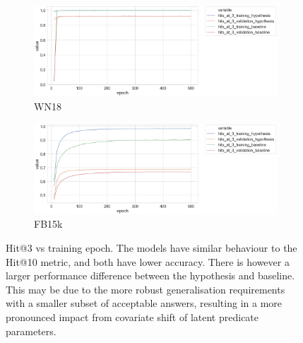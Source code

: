 
\begin{figure}[H]
	\begin{subfigure}[b]{.5\linewidth}
   		\centering
    		\includegraphics[width=1.0\linewidth, height=0.6\linewidth]{WN18_hits_at_3_Results}
		\captionsetup{justification=centering}
		\caption{WN18}
	\end{subfigure}
	\begin{subfigure}[b]{.5\linewidth}
   		\centering
		\includegraphics[width=1.0\linewidth, height=0.6\linewidth]{FB15k_hits_at_3_Results}
		\captionsetup{justification=centering}
		\caption{FB15k}
	\end{subfigure}
	\captionsetup{justification=centering}
	\caption{Hit@3 vs training epoch. The models have similar behaviour to the Hit@10 metric, and both have lower accuracy. There is however a larger performance difference between the hypothesis and baseline. This may be due to the more robust generalisation requirements with a smaller subset of acceptable answers, resulting in a more pronounced impact from covariate shift of latent predicate parameters.}
\end{figure}


